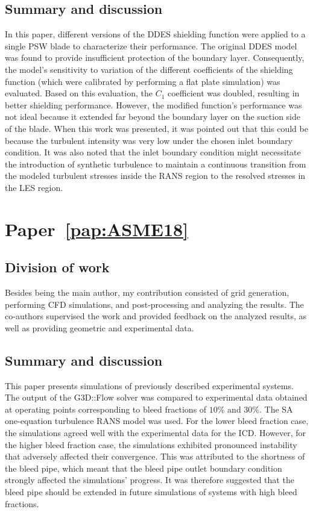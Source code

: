 \subsection{Summary and discussion}
In this paper, different versions of the DDES shielding function were applied to a single PSW blade to characterize their performance. The original DDES model was found to provide insufficient protection of the boundary layer. Consequently, the model's sensitivity to variation of the different coefficients of the shielding function (which were calibrated by performing a flat plate simulation) was evaluated. Based on this evaluation, the $C_1$ coefficient was doubled, resulting in better shielding performance. However, the modified function's performance was not ideal because it extended far beyond the boundary layer on the suction side of the blade. When this work was presented, it was pointed out that this could be because the turbulent intensity was very low under the chosen inlet boundary condition. It was also noted that the inlet boundary condition might necessitate the introduction of synthetic turbulence to maintain a continuous transition from the modeled turbulent stresses inside the RANS region to the resolved stresses in the LES region.


\section{Paper~\ref{pap:ASME18}} 
\subsection{Division of work}
Besides being the main author, my contribution consisted of grid generation, performing CFD simulations, and post-processing and analyzing the results. The co-authors supervised the work and provided feedback on the analyzed results, as well as providing geometric and experimental data.
\subsection{Summary and discussion}
This paper presents simulations of previously described experimental systems. The output of the G3D::Flow solver was compared to experimental data obtained at operating points corresponding to bleed fractions of $10\%$ and $30\%$. The SA one-equation turbulence RANS model was used. For the lower bleed fraction case, the simulations agreed well with the experimental data for the ICD. However, for the higher bleed fraction case, the simulations exhibited pronounced instability that adversely affected their convergence. This was attributed to the shortness of the bleed pipe, which meant that the bleed pipe outlet boundary condition strongly affected the simulations' progress. It was therefore suggested that the bleed pipe should be extended in future simulations of systems with high bleed fractions.


